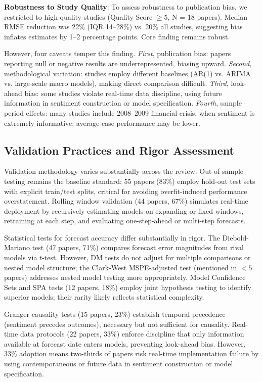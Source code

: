\documentclass[11pt]{article}
\begin{document}
\textbf{Robustness to Study Quality}: To assess robustness to publication bias, we restricted to high-quality studies (Quality Score $\geq 5$, N = 18 papers). Median RMSE reduction was 22\% (IQR 14--28\%) vs. 20\% all studies, suggesting bias inflates estimates by 1--2 percentage points. Core finding remains robust.

However, four caveats temper this finding. \emph{First}, publication bias: papers reporting null or negative results are underrepresented, biasing upward. \emph{Second}, methodological variation: studies employ different baselines (AR(1) vs. ARIMA vs. large-scale macro models), making direct comparison difficult. \emph{Third}, look-ahead bias: some studies violate real-time data discipline, using future information in sentiment construction or model specification. \emph{Fourth}, sample period effects: many studies include 2008--2009 financial crisis, when sentiment is extremely informative; average-case performance may be lower.

\subsection{Validation Practices and Rigor Assessment}

Validation methodology varies substantially across the review. Out-of-sample testing remains the baseline standard: 55 papers (83\%) employ hold-out test sets with explicit train/test splits, critical for avoiding overfit-induced performance overstatement. Rolling window validation (44 papers, 67\%) simulates real-time deployment by recursively estimating models on expanding or fixed windows, retraining at each step, and evaluating one-step-ahead or multi-step forecasts.

Statistical tests for forecast accuracy differ substantially in rigor. The Diebold-Mariano test (47 papers, 71\%) compares forecast error magnitudes from rival models via $t$-test. However, DM tests do not adjust for multiple comparisons or nested model structure; the Clark-West MSPE-adjusted test (mentioned in $<5$ papers) addresses nested model testing more appropriately. Model Confidence Sets and SPA tests (12 papers, 18\%) employ joint hypothesis testing to identify superior models; their rarity likely reflects statistical complexity.

Granger causality tests (15 papers, 23\%) establish temporal precedence (sentiment precedes outcomes), necessary but not sufficient for causality. Real-time data protocols (22 papers, 33\%) enforce discipline that only information available at forecast date enters models, preventing look-ahead bias. However, 33\% adoption means two-thirds of papers risk real-time implementation failure by using contemporaneous or future data in sentiment construction or model specification.
\end{document}
